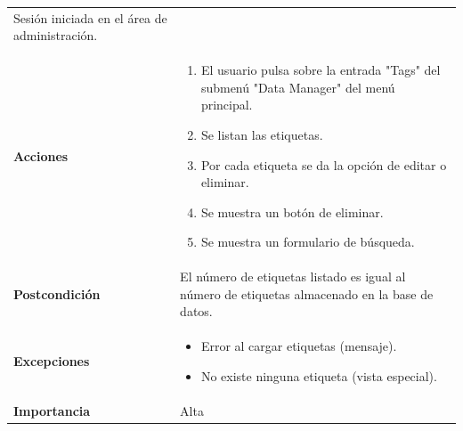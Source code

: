 \documentclass[
]{article}
\providecommand{\tightlist}{%
  \setlength{\itemsep}{0pt}\setlength{\parskip}{0pt}}
\begin{document}
\begin{longtable}[]{@{}ll@{}}
\begin{minipage}[t]{0.74\columnwidth}
Sesión iniciada en el área de administración.\strut
\end{minipage}\tabularnewline
\begin{minipage}[t]{0.20\columnwidth}\raggedright
\textbf{Acciones}\strut
\end{minipage} & \begin{minipage}[t]{0.74\columnwidth}\raggedright
\begin{enumerate}
\def\labelenumi{\arabic{enumi}.}
\tightlist
\item
  El usuario pulsa sobre la entrada "Tags" del submenú "Data Manager"
  del menú principal.
\item
  Se listan las etiquetas.
\item
  Por cada etiqueta se da la opción de editar o eliminar.
\item
  Se muestra un botón de eliminar.
\item
  Se muestra un formulario de búsqueda.
\end{enumerate}\strut
\end{minipage}\tabularnewline
\begin{minipage}[t]{0.20\columnwidth}\raggedright
\textbf{Postcondición}\strut
\end{minipage} & \begin{minipage}[t]{0.74\columnwidth}\raggedright
El número de etiquetas listado es igual al número de etiquetas
almacenado en la base de datos.\strut
\end{minipage}\tabularnewline
\begin{minipage}[t]{0.20\columnwidth}\raggedright
\textbf{Excepciones}\strut
\end{minipage} & \begin{minipage}[t]{0.74\columnwidth}\raggedright
\begin{itemize}
\tightlist
\item
  Error al cargar etiquetas (mensaje).
\item
  No existe ninguna etiqueta (vista especial).
\end{itemize}\strut
\end{minipage}\tabularnewline
\begin{minipage}[t]{0.20\columnwidth}\raggedright
\textbf{Importancia}\strut
\end{minipage} & \begin{minipage}[t]{0.74\columnwidth}\raggedright
Alta\strut
\end{minipage}\tabularnewline
\bottomrule
\end{longtable}
\end{document}
